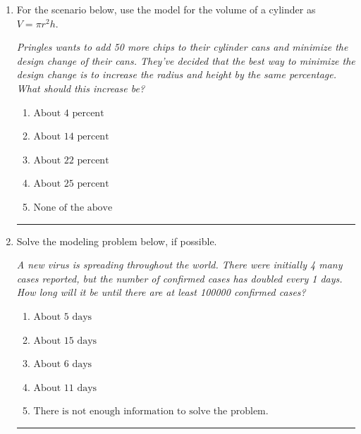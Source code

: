 \documentclass[14pt]{extbook}
\newcommand{\litem}[1]{\item#1\hspace*{-1cm}\rule{\textwidth}{0.4pt}}
\begin{document}
\begin{enumerate}
{\begin{enumerate}[label=\Alph*.]
\end{enumerate} }
\litem{
For the scenario below, use the model for the volume of a cylinder as $V = \pi r^2 h$.
\begin{center}
    \textit{ Pringles wants to add 50 \text{percent} more chips to their cylinder cans and minimize the design change of their cans. They've decided that the best way to minimize the design change is to increase the radius and height by the same percentage. What should this increase be? }
\end{center}
\begin{enumerate}[label=\Alph*.]
\item \( \text{About } 4 \text{ percent} \)
\item \( \text{About } 14 \text{ percent} \)
\item \( \text{About } 22 \text{ percent} \)
\item \( \text{About } 25 \text{ percent} \)
\item \( \text{None of the above} \)

\end{enumerate} }
\litem{
Solve the modeling problem below, if possible.
\begin{center}
    \textit{ A new virus is spreading throughout the world. There were initially 4 many cases reported, but the number of confirmed cases has doubled every 1 days. How long will it be until there are at least 100000 confirmed cases? }
\end{center}
\begin{enumerate}[label=\Alph*.]
\item \( \text{About } 5 \text{ days} \)
\item \( \text{About } 15 \text{ days} \)
\item \( \text{About } 6 \text{ days} \)
\item \( \text{About } 11 \text{ days} \)
\item \( \text{There is not enough information to solve the problem.} \)


\end{enumerate}}
\end{enumerate}
\end{document}
